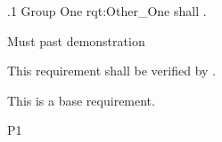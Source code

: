 \ONERQMTV
{\RqtNumberBase.1}
{Group One}
{rqt:Other_One}
{\ThisSys shall \TBD.}
{
	\item [Phase 1] Must past demonstration
}
{This requirement shall be verified by \TBD.}
{
\item [N/A] This is a base requirement.
}
{
	\item \TBD
}
{P1}

